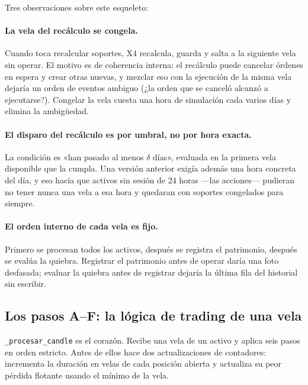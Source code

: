\documentclass[11pt,a4paper]{article}
\newcommand{\code}[1]{\texttt{\small #1}}
\newcommand{\bigsep}{\par\vspace{3pt}}
\begin{document}
\bigsep
Tres observaciones sobre este esqueleto:

\paragraph{La vela del recálculo se congela.} Cuando toca recalcular soportes, X4 recalcula,
guarda y salta a la siguiente vela sin operar. El motivo es de coherencia interna: el
recálculo puede cancelar órdenes en espera y crear otras nuevas, y mezclar eso con la
ejecución de la misma vela dejaría un orden de eventos ambiguo (¿la orden que se canceló
alcanzó a ejecutarse?). Congelar la vela cuesta una hora de simulación cada varios días y
elimina la ambigüedad.

\paragraph{El disparo del recálculo es por umbral, no por hora exacta.} La condición es
«han pasado al menos $\delta$ días», evaluada en la primera vela disponible que la cumpla.
Una versión anterior exigía además una hora concreta del día, y eso hacía que activos sin
sesión de 24 horas —las acciones— pudieran no tener nunca una vela a esa hora y quedaran
con soportes congelados para siempre.

\paragraph{El orden interno de cada vela es fijo.} Primero se procesan todos los activos,
después se registra el patrimonio, después se evalúa la quiebra. Registrar el patrimonio
antes de operar daría una foto desfasada; evaluar la quiebra antes de registrar dejaría la
última fila del historial sin escribir.

\subsection{Los pasos A--F: la lógica de trading de una vela}

\code{_procesar_candle} es el corazón. Recibe una vela de un activo y aplica seis pasos en
orden estricto. Antes de ellos hace dos actualizaciones de contadores: incrementa la
duración en velas de cada posición abierta y actualiza su peor pérdida flotante usando el
mínimo de la vela.
\end{document}
